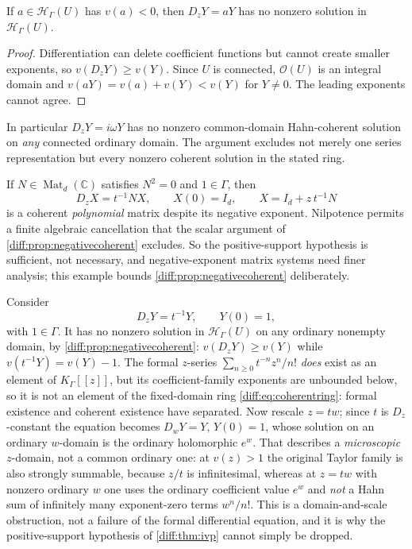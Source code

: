 \documentclass[11pt,letterpaper]{article}
\numberwithin{equation}{section}
\theoremstyle{definition}
\theoremstyle{remark}
\newcommand{\C}{\mathbb C}
\newcommand{\Hring}{\mathscr H}
\newcommand{\Hol}{\mathscr O}
\newcommand{\Dz}{D_{z}}
\newcommand{\Mat}{\operatorname{Mat}}
\begin{document}
\begin{proposition}
\label{diff:prop:negativecoherent}
If $a\in\Hring_{\Gamma}(U)$ has $v(a)<0$, then $\Dz Y=aY$ has no nonzero
solution in $\Hring_{\Gamma}(U)$.
\end{proposition}
\begin{proof}
Differentiation can delete coefficient functions but cannot create smaller
exponents, so $v(\Dz Y)\geq v(Y)$. Since $U$ is connected, $\Hol(U)$ is an
integral domain and $v(aY)=v(a)+v(Y)<v(Y)$ for $Y\neq0$. The leading exponents
cannot agree.
\end{proof}

In particular $\Dz Y=i\omega Y$ has no nonzero common-domain Hahn-coherent
solution on \emph{any} connected ordinary domain. The argument excludes not
merely one series representation but every nonzero coherent solution in the
stated ring.

\begin{example}
\label{diff:ex:nilpotent}
If $N\in\Mat_d(\C)$ satisfies $N^{2}=0$ and $1\in\Gamma$, then
\[
 \Dz X=t^{-1}NX,\qquad X(0)=I_{d},
 \qquad X=I_{d}+z\,t^{-1}N
\]
is a coherent \emph{polynomial} matrix despite its negative exponent.
Nilpotence permits a finite algebraic cancellation that the scalar argument of
\cref{diff:prop:negativecoherent} excludes. So the positive-support hypothesis
is sufficient, not necessary, and negative-exponent matrix systems need finer
analysis; this example bounds \cref{diff:prop:negativecoherent} deliberately.
\end{example}

\begin{example}
\label{diff:ex:singular}
Consider
\begin{equation}\label{diff:eq:singular}
 \Dz Y=t^{-1}Y,\qquad Y(0)=1,
\end{equation}
with $1\in\Gamma$. It has no nonzero solution in $\Hring_{\Gamma}(U)$ on any
ordinary nonempty domain, by \cref{diff:prop:negativecoherent}:
$v(\Dz Y)\geq v(Y)$ while $v(t^{-1}Y)=v(Y)-1$. The formal $z$-series
$\sum_{n\geq0}t^{-n}z^{n}/n!$ \emph{does} exist as an element of
$K_{\Gamma}[[z]]$, but its coefficient-family exponents are unbounded below, so
it is not an element of the fixed-domain ring \cref{diff:eq:coherentring}:
formal existence and coherent existence have separated. Now rescale $z=tw$;
since $t$ is $\Dz$-constant the equation becomes $D_{w}Y=Y$, $Y(0)=1$, whose
solution on an ordinary $w$-domain is the ordinary holomorphic $e^{w}$. That
describes a \emph{microscopic} $z$-domain, not a common ordinary one: at
$v(z)>1$ the original Taylor family is also strongly summable, because $z/t$ is
infinitesimal, whereas at $z=tw$ with nonzero ordinary $w$ one uses the
ordinary coefficient value $e^{w}$ and \emph{not} a Hahn sum of infinitely
many exponent-zero terms $w^{n}/n!$. This is a domain-and-scale obstruction,
not a failure of the formal differential equation, and it is why the
positive-support hypothesis of \cref{diff:thm:ivp} cannot simply be dropped.
\end{example}
\end{document}
